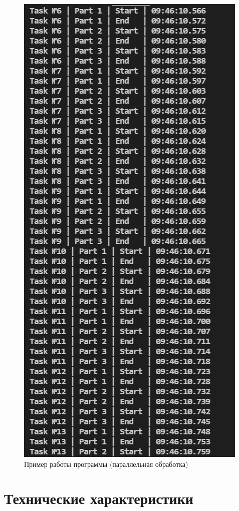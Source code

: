 \documentclass[12pt]{report}
\begin{document}
\begin{figure}
	\centering
	\includegraphics[scale=0.8]{prog_ex.png}
	\caption{Пример работы программы (параллельная обработка)}
	\label{fig:conveyor}
\end{figure}

\section{Технические характеристики}
\end{document}
